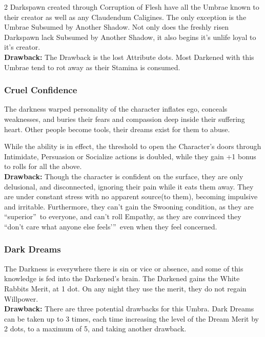 \begin{multicols}{2}
Darkspawn created through Corruption of Flesh have all the Umbrae known to their creator as well as any Claudendum Caligines. The only exception is the Umbrae Subsumed by Another Shadow. Not only does the freshly risen Darkspawn lack Subsumed by Another Shadow, it also begins it's unlife loyal to it's creator. \\

\noindent \textbf{Drawback:} The Drawback is the lost Attribute dots. Most Darkened with this Umbrae tend to rot away as their Stamina is consumed.

\subsubsection*{Cruel Confidence}

The darkness warped personality of the character inflates ego, conceals weaknesses, and buries their fears and compassion deep inside their suffering heart. Other people become tools, their dreams exist for them to abuse.

While the ability is in effect, the threshold to open the Character’s doors through Intimidate, Persuasion or Socialize actions is doubled, while they gain +1 bonus to rolls for all the above.\\

\noindent \textbf{Drawback:} Though the character is confident on the surface, they are only delusional, and disconnected, ignoring their pain while it eats them away. They are under constant stress with no apparent source(to them), becoming impulsive and irritable. Furthermore, they can’t gain the Swooning condition, as they are \textquotedblleft superior\textquotedblright\, to everyone, and can’t roll Empathy, as they are convinced they \textquotedblleft don’t care what anyone else feels’\textquotedblright\, even when they feel concerned.

\subsubsection*{Dark Dreams}
The Darkness is everywhere there is sin or vice or absence, and some of this knowledge is fed into the Darkened's brain. The Darkened gains the White Rabbits Merit, at 1 dot. On any night they use the merit, they do not regain Willpower. \\

\noindent \textbf{Drawback:} There are three potential drawbacks for this Umbra. Dark Dreams can be taken up to 3 times, each time increasing the level of the Dream Merit by 2 dots, to a maximum of 5, and taking another drawback.


\end{multicols}
